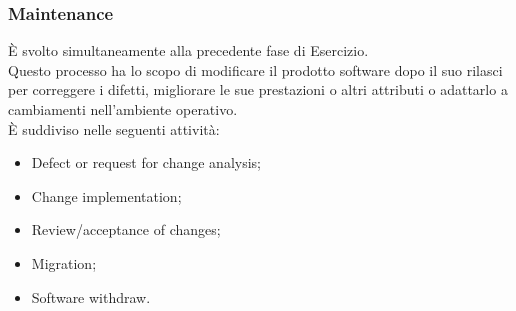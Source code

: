 \subsubsection{Maintenance}

È svolto simultaneamente alla precedente fase di Esercizio.\\

Questo processo ha lo scopo di modificare il prodotto software dopo il suo rilasci per correggere i difetti, migliorare le sue prestazioni o altri attributi o adattarlo a cambiamenti nell'ambiente operativo.\\

È suddiviso nelle seguenti attività:

\begin{itemize}

  \item Defect or request for change analysis;

  \item Change implementation;

  \item Review/acceptance of changes;

  \item Migration;

  \item Software withdraw.

\end{itemize}



